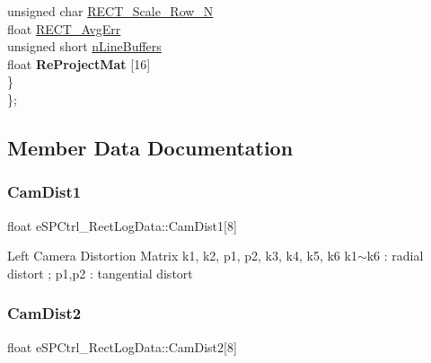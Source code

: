 \begin{DoxyCompactItemize}
\begin{tabbing}
\>\>unsigned char \hyperlink{structe_s_p_ctrl___rect_log_data_a8f3b83d79f2d33742a222c6833f85fac}{RECT\_Scale\_Row\_N}\\
\>\>float \hyperlink{structe_s_p_ctrl___rect_log_data_a5b27f5bf8b81f2e2a030bc8512ec03dd}{RECT\_AvgErr}\\
\>\>unsigned short \hyperlink{structe_s_p_ctrl___rect_log_data_a84bdf9e99658184b19abf2ac2685a7d6}{nLineBuffers}\\
\>\>float {\bfseries ReProjectMat} \mbox{[}16\mbox{]}\\
\>\} \\
\}; \\

\end{tabbing}\end{DoxyCompactItemize}


\subsection{Member Data Documentation}
\mbox{\label{structe_s_p_ctrl___rect_log_data_a3255f05664684db65678ee2a162e6db6}} 
\subsubsection{\texorpdfstring{Cam\+Dist1}{CamDist1}}
{\footnotesize\ttfamily float e\+S\+P\+Ctrl\+\_\+\+Rect\+Log\+Data\+::\+Cam\+Dist1\mbox{[}8\mbox{]}}

Left Camera Distortion Matrix k1, k2, p1, p2, k3, k4, k5, k6 k1$\sim$k6 \+: radial distort ; p1,p2 \+: tangential distort \mbox{\label{structe_s_p_ctrl___rect_log_data_a50fee416f9cc09c4a19d64e1cf6d55f1}} 
\subsubsection{\texorpdfstring{Cam\+Dist2}{CamDist2}}
{\footnotesize\ttfamily float e\+S\+P\+Ctrl\+\_\+\+Rect\+Log\+Data\+::\+Cam\+Dist2\mbox{[}8\mbox{]}}

